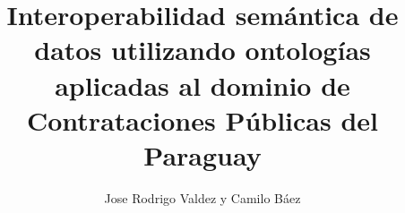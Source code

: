 \documentclass[final,fmstyle]{util/ucathesis}
\title{Interoperabilidad semántica de datos utilizando ontologías aplicadas al dominio de Contrataciones Públicas del Paraguay}
\author{Jose Rodrigo Valdez y Camilo Báez}
\begin{document}
\maketitle     %






\renewcommand{\lstlistingname}{Cuadro}
\renewcommand{\lstlistlistingname}{Índice de \lstlistingname s}

\tableofcontents
\listoffigures
\listoftables
\newpage
\renewcommand\lstlistlistingname{Índice de Cuadros}
 \lstlistoflistings
 




\listofsymbols


\mainmatter  %






%


% 
 

\appendix   %
	
% 
\printbibliography
\end{document}
